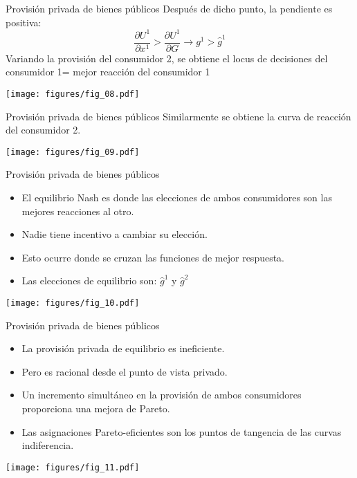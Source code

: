 \begin{frame}{Provisión privada de bienes públicos}
	Después de dicho punto, la pendiente es positiva:
		$$\frac{\partial U^1}{\partial x^1} > \frac{\partial U^1}{\partial G} \rightarrow g^1 > \hat{g}^1$$
	Variando la provisión del consumidor 2, se obtiene el locus de decisiones del consumidor 1= mejor reacción del consumidor 1
	
		\begin{center}
			\texttt{[image: figures/fig\_08.pdf]}
		\end{center}
\end{frame}
\begin{frame}{Provisión privada de bienes públicos}
	Similarmente se obtiene la curva de reacción del consumidor 2.
		\begin{center}
			\texttt{[image: figures/fig\_09.pdf]}
		\end{center}
\end{frame}
\begin{frame}{Provisión privada de bienes públicos}
	\begin{itemize}
		\item El equilibrio Nash es donde las elecciones de ambos consumidores son las mejores reacciones al otro.
		\item Nadie tiene incentivo a cambiar su elección.
		\item Esto ocurre donde se cruzan las funciones de mejor respuesta.
		\item Las elecciones de equilibrio son: $\hat{g}^1$ y $\hat{g}^2$
	\end{itemize}

	\begin{center}
		\texttt{[image: figures/fig\_10.pdf]}
	\end{center}
\end{frame}
\begin{frame}{Provisión privada de bienes públicos}
	\begin{itemize}
		\item La provisión privada de equilibrio es ineficiente.
		\item Pero es racional desde el punto de vista privado. 
		\item Un incremento simultáneo en la provisión de ambos consumidores proporciona una mejora de Pareto.
		\item Las asignaciones  Pareto-eficientes son los puntos de tangencia de las curvas indiferencia.
	\end{itemize}

	\begin{center}
		\texttt{[image: figures/fig\_11.pdf]}
	\end{center}
\end{frame}
